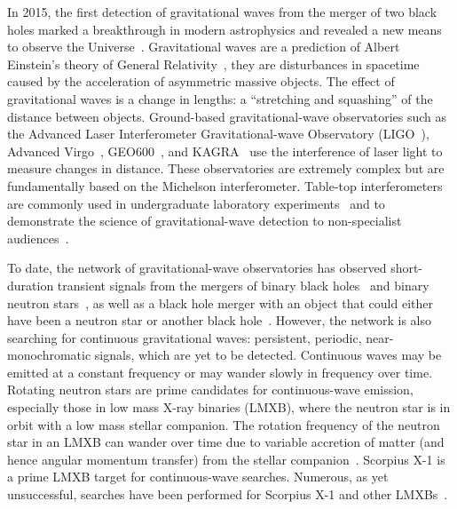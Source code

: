 \documentclass[paper-main.tex]{subfiles}
\begin{document}
In 2015, the first detection of gravitational waves from the merger of two black holes marked a breakthrough in modern astrophysics and revealed a new means to observe the Universe~\cite{GW150914}.
Gravitational waves are a prediction of Albert Einstein's theory of General Relativity~\cite{Einstein:1916}, 
they are disturbances in spacetime caused by the acceleration of asymmetric massive objects.
The effect of gravitational waves is a change in lengths: a ``stretching and squashing'' of the distance between objects. 
Ground-based gravitational-wave observatories such as the Advanced Laser Interferometer Gravitational-wave Observatory (LIGO~\cite{AdvancedLIGO:2015}), Advanced Virgo~\cite{AdvancedVirgo:2015}, GEO600~\cite{GEO600:2010}, and KAGRA~\cite{KAGRA:2013} use the interference of laser light to measure changes in distance. 
These observatories are extremely complex but are fundamentally based on the Michelson interferometer. 
Table-top interferometers are commonly used in undergraduate laboratory experiments~\cite{UgoliniEtAl:2019,LibbrechtBlack:2015} and to demonstrate the science of gravitational-wave detection to non-specialist audiences~\cite{ThorLabsIFO,NikhefIFO,AMIGO:online,TTExhibit:2020,LIGOIFOGlue,LIGOIFOMagnets}.


To date, the network of gravitational-wave observatories has observed short-duration transient signals from the mergers of binary black holes~\cite{GW150914,GW151226,GW170104,GW170814,GW190521,GWTC-1:2018,GWTC-2:2020} and binary neutron stars~\cite{GW170817,GW170817multi,GW190425,GWTC-1:2018,GWTC-2:2020}, as well as a black hole merger with an object that could either have been a neutron star or another black hole~\cite{GW190814}. 
However, the network is also searching for continuous gravitational waves: persistent, periodic, near-monochromatic signals, which are yet to be detected. 
Continuous waves may be emitted at a constant frequency or may wander slowly in frequency over time. 
Rotating neutron stars are prime candidates for continuous-wave emission, especially those in low mass X-ray binaries (LMXB), where the neutron star is in orbit with a low mass stellar companion.
The rotation frequency of the neutron star in an LMXB can wander over time due to variable accretion of matter (and hence angular momentum transfer) from the stellar companion~\cite{xraybinaries:1997}. 
Scorpius X-1 is a prime LMXB target for continuous-wave searches. 
Numerous, as yet unsuccessful, searches have been performed for Scorpius X-1 and other LMXBs~\cite{ScoX1O2Viterbi:2019, ScoX1ViterbiO1:2017, RadiometerO1O2:2019, SearchRadiometerO1:2017, SearchCrossCorrO1:2017, ScoX1ViterbiO1:2017, SearchTwoSpecS6:2017, MiddletonEtAlO2LMXBs:2020}. 
\end{document}

